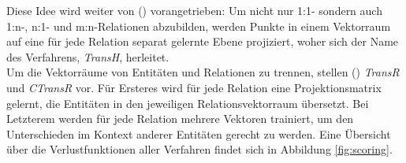 Diese Idee wird weiter von (\cite{wang2014knowledge}) vorangetrieben: Um nicht nur 1:1- sondern auch 1:n-, n:1- und m:n-Relationen
abzubilden, werden Punkte in einem Vektorraum auf eine für jede Relation separat gelernte Ebene projiziert, woher sich
der Name des Verfahrens, \emph{TransH}, herleitet.\\
Um die Vektorräume von Entitäten und Relationen zu trennen, stellen (\cite{lin2015learning}) \emph{TransR} und \emph{CTransR}
vor. Für Ersteres wird für jede Relation eine Projektionsmatrix gelernt, die Entitäten in den jeweiligen Relationsvektorraum
übersetzt. Bei Letzterem werden für jede Relation mehrere Vektoren trainiert, um den Unterschieden im Kontext
anderer Entitäten gerecht zu werden. Eine Übersicht über die Verlustfunktionen aller Verfahren findet sich in Abbildung
\ref{fig:scoring}.
